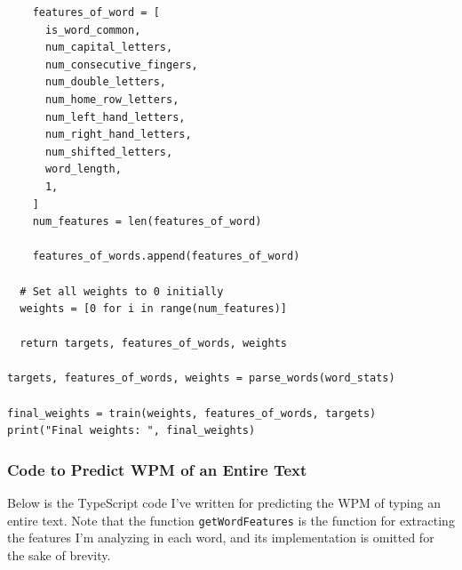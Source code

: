 \documentclass[12pt]{article}
\newcommand{\code}[1]{\texttt{#1}}
\begin{document}
\begin{verbatim}
    features_of_word = [
      is_word_common,
      num_capital_letters,
      num_consecutive_fingers,
      num_double_letters,
      num_home_row_letters,
      num_left_hand_letters,
      num_right_hand_letters,
      num_shifted_letters,
      word_length,
      1,
    ]
    num_features = len(features_of_word)

    features_of_words.append(features_of_word)

  # Set all weights to 0 initially
  weights = [0 for i in range(num_features)]

  return targets, features_of_words, weights

targets, features_of_words, weights = parse_words(word_stats)

final_weights = train(weights, features_of_words, targets)
print("Final weights: ", final_weights)
\end{verbatim}

\subsubsection*{Code to Predict WPM of an Entire Text}

Below is the TypeScript code I've written for predicting the WPM of typing an entire text. Note that the function \code{getWordFeatures} is the function for extracting the features I'm analyzing in each word, and its implementation is omitted for the sake of brevity.
\end{document}

